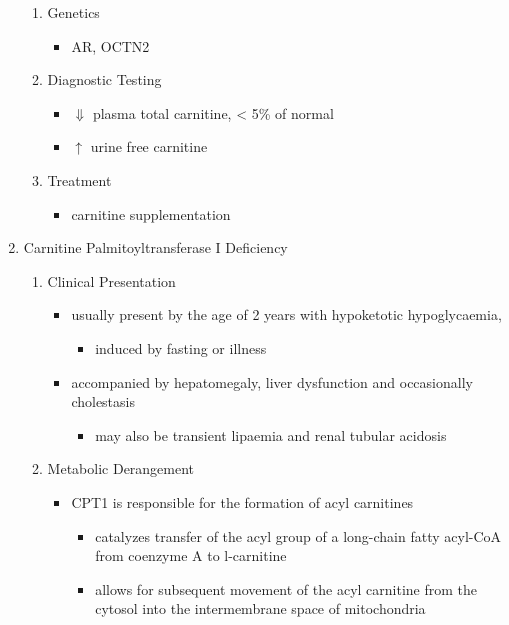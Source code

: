 \documentclass{scrartcl}
\begin{document}
\begin{enumerate}
\begin{enumerate}
\item Genetics
\label{sec:org8263239}
\begin{itemize}
\item AR, OCTN2
\end{itemize}
\item Diagnostic Testing
\label{sec:org826a42c}
\begin{itemize}
\item \(\Downarrow\) plasma total carnitine, \textless{} 5\% of normal
\item \(\uparrow\) urine free carnitine
\end{itemize}
\item Treatment
\label{sec:org01bacff}
\begin{itemize}
\item carnitine supplementation
\end{itemize}
\end{enumerate}
\item Carnitine Palmitoyltransferase I Deficiency
\label{sec:orgadfe67a}
\begin{enumerate}
\item Clinical Presentation
\label{sec:org608f0a9}
\begin{itemize}
\item usually present by the age of 2 years with hypoketotic hypoglycaemia,
\begin{itemize}
\item induced by fasting or illness
\end{itemize}
\item accompanied by hepatomegaly, liver dysfunction and occasionally cholestasis
\begin{itemize}
\item may also be transient lipaemia and renal tubular acidosis
\end{itemize}
\end{itemize}
\item Metabolic Derangement
\label{sec:orgdae2c8a}
\begin{itemize}
\item CPT1 is responsible for the formation of acyl carnitines
\begin{itemize}
\item catalyzes transfer of the acyl group of a long-chain fatty
acyl-CoA from coenzyme A to l-carnitine
\item allows for subsequent movement of the acyl carnitine from the
cytosol into the intermembrane space of mitochondria
\end{itemize}

\end{itemize}
\end{enumerate}
\end{enumerate}
\end{document}
